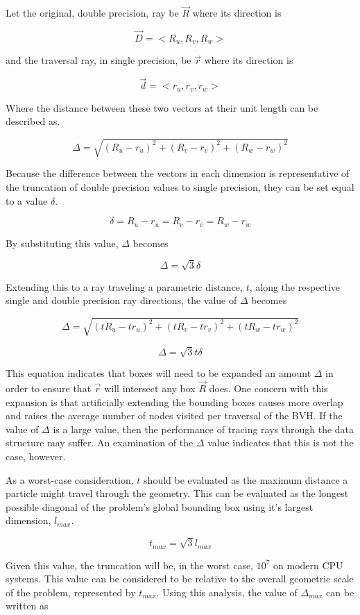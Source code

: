 Let the original, double precision, ray be $\vec{R}$ where its direction is

$$ \vec{D} = < R_{u}, R_{v}, R_{w} > $$

and the traversal ray, in single precision, be $\vec{r}$ where its direction is

$$ \vec{d} = < r_{u}, r_{v}, r_{w} > $$

Where the distance between these two vectors at their unit length
can be described as.

$$ \Delta = \sqrt{ (R_{u} - r_{u})^{2} + (R_{v} - r_{v})^{2} + (R_{w} -
  r_{w})^{2} } $$

Because the difference between the vectors in each dimension is representative
of the truncation of double precision values to single precision, they can be
set equal to a value $\delta$.

$$ \delta = R_{u} - r_{u} = R_{v} - r_{v} = R_{w} -  r_{w} $$

By substituting this value, $\Delta$ becomes

$$ \Delta = \sqrt{3} \delta $$

Extending this to a ray traveling a parametric distance, $t$, along the
respective single and double precision ray directions, the value of $\Delta$
becomes

$$ \Delta = \sqrt{ (tR_{u} - tr_{u})^{2} + (tR_{v} - tr_{v})^{2} + (tR_{w} -
  tr_{w})^{2} } $$

$$ \Delta = \sqrt{3} t \delta $$

This equation indicates that boxes will need to be expanded an amount $\Delta$
in order to ensure that $\vec{r}$ will intersect any box $\vec{R}$ does. One
concern with this expansion is that artificially extending the bounding boxes
causes more overlap and raises the average number of nodes visited per traversal
of the BVH. If the value of $\Delta$ is a large value, then the performance of
tracing rays through the data structure may suffer. An examination of the
$\Delta$ value indicates that this is not the case, however.

As a worst-case consideration, $t$ should be evaluated as the maximum distance a
particle might travel through the geometry. This can be evaluated as the longest
possible diagonal of the problem's global bounding box using it's largest
dimension, $l_{max}$.

$$ t_{max} = \sqrt{3} l_{max} $$

Given this value, the truncation will be, in the worst case, $10^{7}$ on modern
CPU systems. This value can be considered to be relative to the overall
geometric scale of the problem, represented by $t_{max}$. Using this analysis,
the value of $\Delta_{max}$ can be written as 

